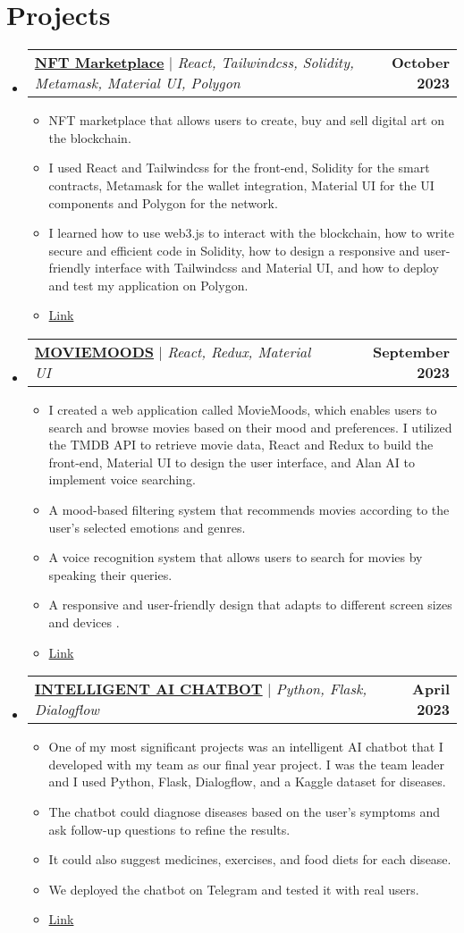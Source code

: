 \documentclass[letterpaper,11pt]{article}
\makeatletter
\newcommand{\resumeItem}[1]{
  \item\small{
    {#1 \vspace{-2pt}}
  }
}
\newcommand{\resumeProjectHeading}[2]{
    \item
    \begin{tabular*}{1.001\textwidth}{l@{\extracolsep{\fill}}r}
      \small#1 & \textbf{\small #2}\\
    \end{tabular*}\vspace{-7pt}
}
\newcommand{\resumeSubHeadingListStart}{\begin{itemize}[leftmargin=0.0in, label={}]}
\newcommand{\resumeSubHeadingListEnd}{\end{itemize}}
\newcommand{\resumeItemListStart}{\begin{itemize}}
\newcommand{\resumeItemListEnd}{\end{itemize}\vspace{-5pt}}
\makeatother
\begin{document}
\section{Projects}
    \vspace{-5pt}
    \resumeSubHeadingListStart
    \resumeProjectHeading
          {\href{https://nft---marketplace.vercel.app/}{\textbf{NFT Marketplace}} $|$ \emph{React, Tailwindcss, Solidity, Metamask, Material UI, Polygon}}{October 2023}
          \resumeItemListStart
            \resumeItem{NFT marketplace that allows users to create, buy and sell digital art on the blockchain.}
            \resumeItem{I used React and Tailwindcss for the front-end, Solidity for the smart contracts, Metamask for the wallet integration, Material UI for the UI components and Polygon for the network.}
            \resumeItem{ I learned how to use web3.js to interact with the blockchain, how to write secure and efficient code in Solidity, how to design a responsive and user-friendly interface with Tailwindcss and Material UI, and how to deploy and test my application on Polygon.}
            \resumeItem{\href{https://nft---marketplace.vercel.app/}{Link}} %
          \resumeItemListEnd  
          \vspace{-13pt}
          \resumeProjectHeading
          {\href{https://moviemoods.vercel.app/}{\textbf{MOVIEMOODS}} $|$ \emph{React, Redux, Material UI}}{September 2023}
          \resumeItemListStart
            \resumeItem{I created a web application called MovieMoods, which enables users to search and browse movies based on their mood and preferences. I utilized the TMDB API to retrieve movie data, React and Redux to build the front-end, Material UI to design the user interface, and Alan AI to implement voice searching. }
            \resumeItem{A mood-based filtering system that recommends movies according to the user's selected emotions and genres. }
            \resumeItem{A voice recognition system that allows users to search for movies by speaking their queries. }
            \resumeItem{A responsive and user-friendly design that adapts to different screen sizes and devices .}
            \resumeItem{\href{https://moviemoods.vercel.app/}{Link}} %
          \resumeItemListEnd 
          \vspace{-13pt}
          \resumeProjectHeading
          {\href{https://t.me/AI_DoctorBot}{\textbf{INTELLIGENT AI CHATBOT}} $|$ \emph{Python, Flask, Dialogflow }}{April 2023}
          \resumeItemListStart
            \resumeItem{One of my most significant projects was an intelligent AI chatbot that I developed with my team as our final year project. I was the team leader and I used Python, Flask, Dialogflow, and a Kaggle dataset for diseases. }
            \resumeItem{The chatbot could diagnose diseases based on the user's symptoms and ask follow-up questions to refine the results. }
            \resumeItem{It could also suggest medicines, exercises, and food diets for each disease. }
            \resumeItem{We deployed the chatbot on Telegram and tested it with real users.}
            \resumeItem{\href{https://t.me/AI_DoctorBot}{Link}} %
          \resumeItemListEnd 
    \resumeSubHeadingListEnd
\vspace{-15pt}
\end{document}

